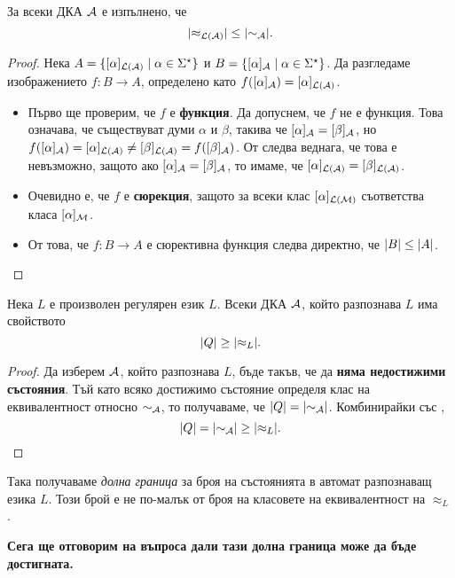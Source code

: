 \begin{cor}
  \label{cor:approx-less-sim}
  За всеки ДКА $\mathcal{A}$ е изпълнено, че
  \[\lvert{\approx_{\mathcal{L}(\mathcal{A})}}\rvert \leq \lvert{\sim_{\mathcal{A}}}\rvert.\]
\end{cor}
\begin{proof}
  Нека $A = \{[\alpha]_{\mathcal{L}(\mathcal{A})} \mid \alpha\in\Sigma^\star\}$ и $B = \{[\alpha]_{\mathcal{A}} \mid \alpha\in\Sigma^\star\}$.
  Да разгледаме изображението $f:B\to A$, определено като $f([\alpha]_{\mathcal{A}}) = [\alpha]_{\mathcal{L}(\mathcal{A})}$.
  \begin{itemize}
  \item 
    Първо ще проверим, че $f$ е {\bf функция}. Да допуснем, че $f$ не е функция.
    Това означава, че съществуват думи $\alpha$ и $\beta$, такива че
    $[\alpha]_{\mathcal{A}} = [\beta]_{\mathcal{A}}$, но $f([\alpha]_{\mathcal{A}}) = [\alpha]_{\mathcal{L}(\mathcal{A})} \neq [\beta]_{\mathcal{L}(\mathcal{A})} = f([\beta]_{\mathcal{A}})$.
    От  следва веднага, че това е невъзможно, защото ако $[\alpha]_{\mathcal{A}} = [\beta]_{\mathcal{A}}$, 
    то имаме, че $[\alpha]_{\mathcal{L}(\mathcal{A})} = [\beta]_{\mathcal{L}(\mathcal{A})}$.    
  \item
    Очевидно е, че $f$ е {\bf сюрекция}, защото за всеки клас $[\alpha]_{\mathcal{L}(\mathcal{M})}$ съответства класа $[\alpha]_{\mathcal{M}}$.
  \item
    От това, че $f:B\to A$ е сюрективна функция следва директно, че $\lvert{B}\rvert \leq \lvert{A}\rvert$.
  \end{itemize}
\end{proof}

\begin{cor}
  \label{cor:upper-bound}
  Нека $L$ е произволен регулярен език $L$.  
  Всеки ДКА $\mathcal{A}$, който разпознава $L$ има свойството
  \[\lvert{Q}\rvert \geq \lvert{\approx_L}\rvert.\]
\end{cor}
\begin{proof}
  Да изберем $\mathcal{A}$, който разпознава $L$, бъде такъв, че да {\bf няма недостижими състояния}.
  Тъй като всяко достижимо състояние определя клас на еквивалентност относно $\sim_{\mathcal{A}}$,
  то получаваме, че $\lvert{Q}\rvert = \lvert{\sim_{\mathcal{A}}}\rvert$.
  Комбинирайки със ,
  \[\lvert{Q}\rvert = \lvert{\sim_{\mathcal{A}}}\rvert \geq \lvert{\approx_L}\rvert.\]
\end{proof}
Така получаваме {\em долна граница} за броя на състоянията в автомат разпознаващ езика $L$.
Този брой е не по-малък от броя на класовете на еквивалентност на $\approx_L$.

{\bf Сега ще отговорим на въпроса дали тази долна граница може да бъде достигната.}


